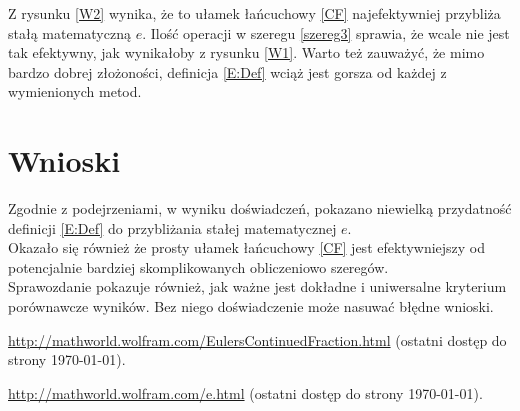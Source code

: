 \documentclass{article}
\begin{document}
Z rysunku \ref{W2} wynika, że to ułamek łańcuchowy \eqref{CF} najefektywniej przybliża stałą matematyczną $e$. Ilość operacji w szeregu \eqref{szereg3} sprawia, że wcale nie jest tak efektywny, jak wynikałoby z rysunku \ref{W1}. Warto też zauważyć, że mimo bardzo dobrej złożoności, definicja \eqref{E:Def} wciąż jest gorsza od każdej z wymienionych metod.

\section{Wnioski}


\indent
Zgodnie z podejrzeniami, w wyniku doświadczeń, pokazano niewielką przydatność definicji \eqref{E:Def} do przybliżania stałej matematycznej $e$.
\\ \indent
 Okazało się również że prosty ułamek łańcuchowy \ref{CF} jest efektywniejszy od potencjalnie bardziej skomplikowanych obliczeniowo szeregów. \\\indent
Sprawozdanie pokazuje również, jak ważne jest dokładne i uniwersalne kryterium porównawcze wyników. Bez niego doświadczenie może nasuwać błędne wnioski.


\begin{thebibliography}{9}
	\itemsep2pt
	 \url{http://mathworld.wolfram.com/EulersContinuedFraction.html}
	(ostatni dostęp do strony \today).
	
	 \url{http://mathworld.wolfram.com/e.html}
	(ostatni dostęp do strony \today).
		
\end{thebibliography}
\end{document}
